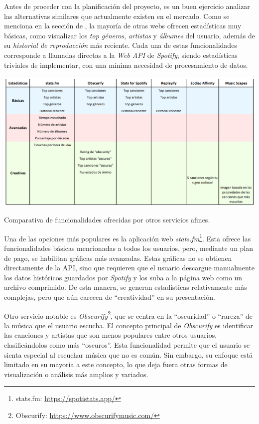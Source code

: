 Antes de proceder con la planificación del proyecto, es un buen ejercicio analizar las alternativas similares que actualmente existen en el mercado. Como se menciona en la sección de , la mayoría de otras webs ofrecen estadísticas muy básicas, como visualizar los \textit{top géneros}, \textit{artistas} y \textit{álbumes} del usuario, además de su \textit{historial de reproducción} más reciente. Cada una de estas funcionalidades corresponde a llamadas directas a la \textit{Web API} de \textit{Spotify}, siendo estadísticas triviales de implementar, con una mínima necesidad de procesamiento de datos.

\vspace{0.5cm}

\begin{table}[htbp]
    \centering
    \includegraphics[width=\textwidth]{figures/tabla_comparativa.png}
    \caption{Comparativa de funcionalidades ofrecidas por otros servicios afines.}
    \label{tab:comparativa}
\end{table}

\vspace{0.5cm}

Una de las opciones más populares es la aplicación web \textit{stats.fm}\footnote{stats.fm: \url{https://spotistats.app/}}. Esta ofrece las funcionalidades básicas mencionadas a todos los usuarios, pero, mediante un plan de pago, se habilitan gráficas más avanzadas. Estas gráficas no se obtienen directamente de la API, sino que requieren que el usuario descargue manualmente los datos históricos guardados por \textit{Spotify} y los suba a la página web como un archivo comprimido. De esta manera, se generan estadísticas relativamente más complejas, pero que aún carecen de ``creatividad'' en su presentación.

Otro servicio notable es \textit{Obscurify}\footnote{Obscurify: \url{https://www.obscurifymusic.com/}}, que se centra en la ``oscuridad'' o ``rareza'' de la música que el usuario escucha. El concepto principal de \textit{Obscurify} es identificar las canciones y artistas que son menos populares entre otros usuarios, clasificándolos como más ``oscuros''. Esta funcionalidad permite que el usuario se sienta especial al escuchar música que no es común. Sin embargo, su enfoque está limitado en su mayoría a este concepto, lo que deja fuera otras formas de visualización o análisis más amplios y variados.

